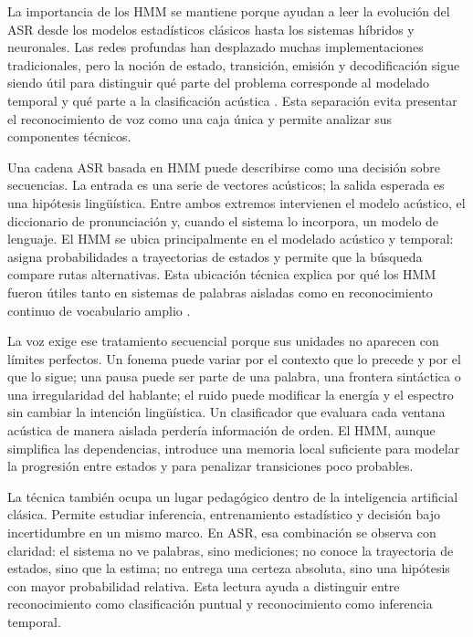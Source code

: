 La importancia de los HMM se mantiene porque ayudan a leer la evolución del ASR desde los modelos estadísticos clásicos hasta los sistemas híbridos y neuronales. Las redes profundas han desplazado muchas implementaciones tradicionales, pero la noción de estado, transición, emisión y decodificación sigue siendo útil para distinguir qué parte del problema corresponde al modelado temporal y qué parte a la clasificación acústica \cite{Mustafa2019ComparReview}. Esta separación evita presentar el reconocimiento de voz como una caja única y permite analizar sus componentes técnicos.

Una cadena ASR basada en HMM puede describirse como una decisión sobre secuencias. La entrada es una serie de vectores acústicos; la salida esperada es una hipótesis lingüística. Entre ambos extremos intervienen el modelo acústico, el diccionario de pronunciación y, cuando el sistema lo incorpora, un modelo de lenguaje. El HMM se ubica principalmente en el modelado acústico y temporal: asigna probabilidades a trayectorias de estados y permite que la búsqueda compare rutas alternativas. Esta ubicación técnica explica por qué los HMM fueron útiles tanto en sistemas de palabras aisladas como en reconocimiento continuo de vocabulario amplio \cite{Lee1990SpeechRecogn,ilingas2004SpecifHidden}.

La voz exige ese tratamiento secuencial porque sus unidades no aparecen con límites perfectos. Un fonema puede variar por el contexto que lo precede y por el que lo sigue; una pausa puede ser parte de una palabra, una frontera sintáctica o una irregularidad del hablante; el ruido puede modificar la energía y el espectro sin cambiar la intención lingüística. Un clasificador que evaluara cada ventana acústica de manera aislada perdería información de orden. El HMM, aunque simplifica las dependencias, introduce una memoria local suficiente para modelar la progresión entre estados y para penalizar transiciones poco probables.

La técnica también ocupa un lugar pedagógico dentro de la inteligencia artificial clásica. Permite estudiar inferencia, entrenamiento estadístico y decisión bajo incertidumbre en un mismo marco. En ASR, esa combinación se observa con claridad: el sistema no ve palabras, sino mediciones; no conoce la trayectoria de estados, sino que la estima; no entrega una certeza absoluta, sino una hipótesis con mayor probabilidad relativa. Esta lectura ayuda a distinguir entre reconocimiento como clasificación puntual y reconocimiento como inferencia temporal.

